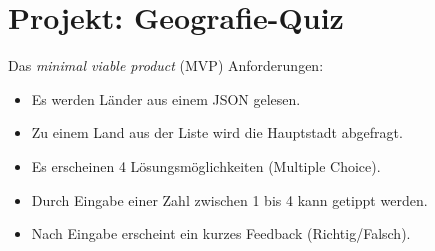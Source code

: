 \section{Projekt: Geografie-Quiz}


\begin{frame}
\begin{block}{Das \emph{minimal viable product} (MVP)}
\vspace{2pt}
Anforderungen: 
\pause 
\begin{itemize}[<+->]
	\item Es werden Länder aus einem JSON gelesen.
	\item Zu einem Land aus der Liste wird die Hauptstadt abgefragt.
	\item Es erscheinen 4 Lösungsmöglichkeiten (Multiple Choice).
	\item Durch Eingabe einer Zahl zwischen 1 bis 4 kann getippt werden. 
	\item Nach Eingabe erscheint ein kurzes Feedback (Richtig/Falsch).  
\end{itemize}
\end{block}
\end{frame}
	
